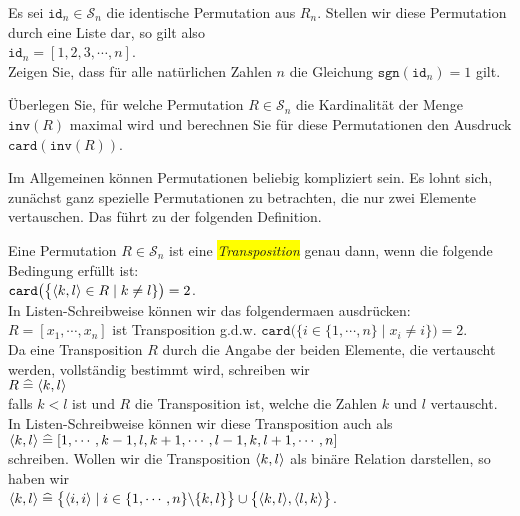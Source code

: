 \exercise
Es sei $\mathtt{id}_n \in \mathcal{S}_n$ die identische Permutation aus $R_n$.  Stellen wir diese Permutation
durch eine Liste dar, so gilt also
\\[0.2cm]
\hspace*{1.3cm}
$\mathtt{id}_n = [1,2,3, \cdots, n]$.
\\[0.2cm]
Zeigen Sie, dass f\"ur alle nat\"urlichen Zahlen $n$ die Gleichung
 $\mathtt{sgn}(\mathtt{id}_n) = 1$
 gilt.  \eoxs


\exercise
\"Uberlegen Sie, f\"ur welche Permutation $R \in \mathcal{S}_n$ die Kardinalit\"at der Menge
$\mathtt{inv}(R)$ maximal wird und berechnen Sie f\"ur diese Permutationen den Ausdruck
$\mathtt{card}(\mathtt{inv}(R))$. \eoxs
\pagebreak

Im Allgemeinen k\"onnen Permutationen beliebig kompliziert sein.  Es lohnt sich, zun\"achst ganz
spezielle Permutationen zu betrachten, die nur zwei Elemente vertauschen.  Das f\"uhrt zu der
folgenden Definition.

\begin{Definition}[Transposition]
  Eine Permutation $R \in \mathcal{S}_n$ ist eine \colorbox{yellow}{\emph{Transposition}} genau dann, wenn
  die folgende Bedingung erf\"ullt ist:
  \\[0.2cm]
  \hspace*{1.3cm}
  $\mathtt{card}\bigl(\bigl\{ \pair(k,l) \in R \mid k \not= l \}\bigr) = 2$.
  \\[0.2cm]
  In Listen-Schreibweise k\"onnen wir das folgenderma\3en ausdr\"ucken:
  \\[0.2cm]
  \hspace*{1.3cm}
  $R = [x_1, \cdots, x_n]$  ist Transposition \quad g.d.w. \quad $\mathtt{card}\bigl(\bigl\{i \in \{1,\cdots,n\} \mid x_i \not= i \bigr\}\bigr) = 2$.
  \\[0.2cm]
  Da eine Transposition $R$ durch die Angabe der beiden Elemente, die vertauscht werden, vollst\"andig
  bestimmt wird, schreiben wir
  \\[0.2cm]
  \hspace*{1.3cm}
  $R \;\widehat{=}\; \pair(k, l)$ 
  \\[0.2cm]
  falls $k < l$ ist und $R$ die Transposition ist, welche die Zahlen $k$ und $l$ vertauscht.  In Listen-Schreibweise
  k\"onnen wir diese Transposition auch als
  \\[0.2cm]
  \hspace*{1.3cm}
  $\pair(k, l) \;\widehat{=}\; [1, \cdots, k-1, l, k+1, \cdots, l-1, k, l+1, \cdots, n]$
  \\[0.2cm]
  schreiben.  Wollen wir die Transposition $\pair(k, l)$ als bin\"are Relation darstellen, so haben wir
  \\[0.2cm]
  \hspace*{1.3cm}
  $\pair(k,l) \;\widehat{=}\; \bigl\{ \pair(i,i) \mid i \in \{ 1, \cdots, n \} \backslash \{k,l\} \bigr\} \cup \bigl\{ \pair(k,l), \pair(l,k) \bigr\}$.
  \eoxs
\end{Definition}

